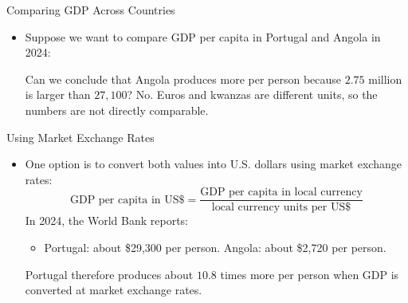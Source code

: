 \documentclass[10pt,aspectratio=169]{beamer}
\begin{document}
\begin{frame}{Comparing GDP Across Countries}

\begin{itemize}
    \item Suppose we want to compare GDP per capita in Portugal and Angola in 2024:
    \begin{table}
    \end{table}

    \itemvso Can we conclude that Angola produces more per person because
    \(2.75\) million is larger than \(27{,}100\)?
    \itemvso No. Euros and kwanzas are different units, so the numbers are not
    directly comparable.
\end{itemize}

\end{frame}


\begin{frame}{Using Market Exchange Rates}

\begin{itemize}
    \item One option is to convert both values into U.S. dollars using market
    exchange rates:
    \[
        \text{GDP per capita in US\$}
        =
        \frac{\text{GDP per capita in local currency}}
        {\text{local currency units per US\$}}
    \]
    \itemvso In 2024, the World Bank reports:
    \begin{itemize}
        \item Portugal: about \$29,300 per person.
        \itemvso Angola: about \$2,720 per person.
    \end{itemize}
    \itemvso Portugal therefore produces about \(10.8\) times more per person
    when GDP is converted at market exchange rates.
\end{itemize}


\end{frame}
\end{document}
